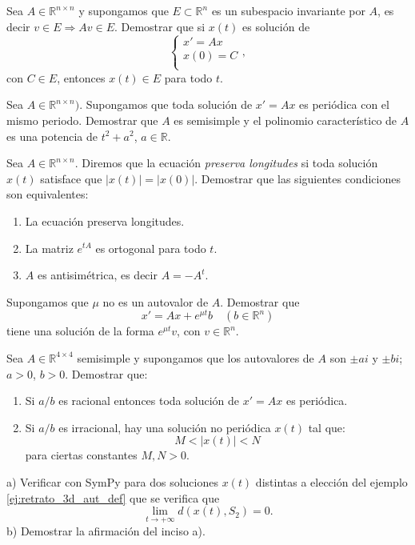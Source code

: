 \begin{ejercicio}{} Sea $A\in \mathbb{R}^{n\times n}$  y supongamos que
$E\subset\mathbb{R}^n$ es un subespacio  invariante por $A$, es decir $v\in E\Rightarrow Av\in E$. Demostrar
que si $x(t)$ es solución de
\[
  \left\{%
\begin{array}{ll}
     x'=Ax \\
    x(0)=C \\
\end{array}%
\right.,
\]
con $C\in E$, entonces $x(t)\in E$ para todo $t$.
\end{ejercicio}


\begin{ejercicio}{} Sea $A\in\mathbb{R}^{n\times n})$. Supongamos que toda solución de
$x'=Ax$ es periódica con el mismo periodo. Demostrar que $A$ es
semisimple y el polinomio característico de $A$ es una potencia
de $t^2+a^2$, $a\in\mathbb{R}$.
\end{ejercicio}


\begin{ejercicio}{} Sea $A\in\mathbb{R}^{n\times n}$. Diremos que la ecuación
\emph{preserva longitudes} si toda solución $x(t)$ satisface que
$|x(t)|=|x(0)|$. Demostrar que las siguientes condiciones son
equivalentes:
\begin{enumerate}
\item La ecuación preserva longitudes.
\item La matriz $e^{tA}$ es ortogonal para todo $t$.
\item $A$ es antisimétrica, es decir $A=-A^t$.
\end{enumerate}
\end{ejercicio}


\begin{ejercicio}{} Supongamos que $\mu$ no es un autovalor de $A$. Demostrar que
\[
    x'=Ax+e^{\mu t}b\quad (b\in\mathbb{R}^n)
\]
tiene una solución de la forma $e^{\mu t}v$, con
$v\in\mathbb{R}^n$.
\end{ejercicio}



\begin{ejercicio} Sea $A\in \mathbb{R}^{4\times 4} $ semisimple y
supongamos que los autovalores de $A$ son $\pm ai$ y $\pm bi$;
$a>0$, $b>0$.  Demostrar que:
\begin{enumerate}
    \item Si $a/b$ es racional entonces toda solución de $x'=Ax$
    es periódica.
    \item Si $a/b$ es irracional, hay una solución no periódica
    $x(t)$ tal que:
        \[
            M<|x(t)|<N
        \]
    para ciertas constantes $M,N>0$.
\end{enumerate}
\end{ejercicio}

 \begin{ejercicio} a) Verificar con SymPy para dos soluciones $x(t)$ distintas a elección del ejemplo \ref{ej:retrato_3d_aut_def} que se verifica que
 \[
  \lim_{t\to+\infty}d(x(t),S_2)=0.
 \]
b) Demostrar la afirmación del inciso a).
 \end{ejercicio}


 
 

